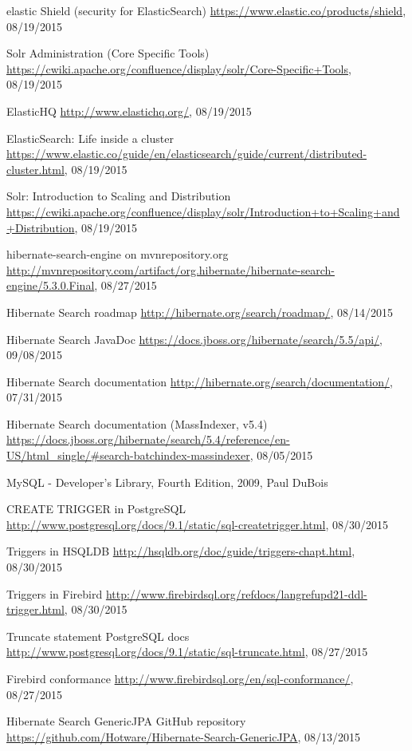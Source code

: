 \begin{thebibliography}{100}
	 elastic Shield (security for ElasticSearch)
	\url{https://www.elastic.co/products/shield}, 08/19/2015

	 Solr Administration (Core Specific Tools)
	\url{https://cwiki.apache.org/confluence/display/solr/Core-Specific+Tools}, 08/19/2015

	 ElasticHQ
	\url{http://www.elastichq.org/}, 08/19/2015

	 ElasticSearch: Life inside a cluster
	\url{https://www.elastic.co/guide/en/elasticsearch/guide/current/distributed-cluster.html}, 08/19/2015

	 Solr: Introduction to Scaling and Distribution
	\url{https://cwiki.apache.org/confluence/display/solr/Introduction+to+Scaling+and+Distribution}, 08/19/2015

	 hibernate-search-engine on mvnrepository.org
	\url{http://mvnrepository.com/artifact/org.hibernate/hibernate-search-engine/5.3.0.Final}, 08/27/2015

	 Hibernate Search roadmap
	\url{http://hibernate.org/search/roadmap/}, 08/14/2015

	 Hibernate Search JavaDoc
	\url{https://docs.jboss.org/hibernate/search/5.5/api/}, 09/08/2015

	 Hibernate Search documentation
	\url{http://hibernate.org/search/documentation/}, 07/31/2015

	 Hibernate Search documentation (MassIndexer, v5.4)
	\url{https://docs.jboss.org/hibernate/search/5.4/reference/en-US/html_single/#search-batchindex-massindexer}, 08/05/2015

	 MySQL - Developer's Library, Fourth Edition, 2009, Paul DuBois

	 CREATE TRIGGER in PostgreSQL
	\url{http://www.postgresql.org/docs/9.1/static/sql-createtrigger.html}, 08/30/2015

	 Triggers in HSQLDB
	\url{http://hsqldb.org/doc/guide/triggers-chapt.html}, 08/30/2015

	 Triggers in Firebird
	\url{http://www.firebirdsql.org/refdocs/langrefupd21-ddl-trigger.html}, 08/30/2015

	 Truncate statement PostgreSQL docs
	\url{http://www.postgresql.org/docs/9.1/static/sql-truncate.html}, 08/27/2015

	 Firebird conformance
	\url{http://www.firebirdsql.org/en/sql-conformance/}, 08/27/2015

	 Hibernate Search GenericJPA GitHub repository
	\url{https://github.com/Hotware/Hibernate-Search-GenericJPA}, 08/13/2015


\end{thebibliography}

\newpage{\pagestyle{empty}\cleardoublepage}